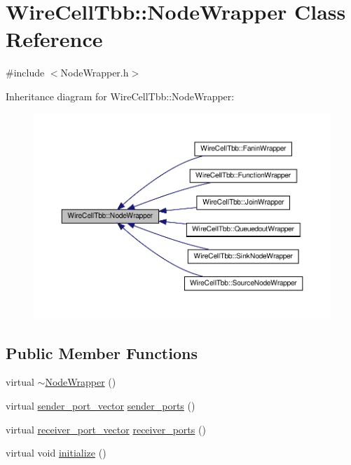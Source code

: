 \hypertarget{class_wire_cell_tbb_1_1_node_wrapper}{}\section{Wire\+Cell\+Tbb\+:\+:Node\+Wrapper Class Reference}
\label{class_wire_cell_tbb_1_1_node_wrapper}


{\ttfamily \#include $<$Node\+Wrapper.\+h$>$}



Inheritance diagram for Wire\+Cell\+Tbb\+:\+:Node\+Wrapper\+:
\nopagebreak
\begin{figure}[H]
\begin{center}
\leavevmode
\includegraphics[width=350pt]{class_wire_cell_tbb_1_1_node_wrapper__inherit__graph}
\end{center}
\end{figure}
\subsection*{Public Member Functions}
\begin{DoxyCompactItemize}
\item 
virtual \hyperlink{class_wire_cell_tbb_1_1_node_wrapper_a251ffca4138c2d0a1266fe1f91bbfd3b}{$\sim$\+Node\+Wrapper} ()
\item 
virtual \hyperlink{namespace_wire_cell_tbb_a99272fef0f0c33dc9d4e6e8f777b2e6e}{sender\+\_\+port\+\_\+vector} \hyperlink{class_wire_cell_tbb_1_1_node_wrapper_a4ed2daeddbb2f75934759ac8f9a3ce8b}{sender\+\_\+ports} ()
\item 
virtual \hyperlink{namespace_wire_cell_tbb_a87f42fe8a3ccc3bf9d315cb2d252c7af}{receiver\+\_\+port\+\_\+vector} \hyperlink{class_wire_cell_tbb_1_1_node_wrapper_ac3c636904e4d3d1df0939906dd8853c7}{receiver\+\_\+ports} ()
\item 
virtual void \hyperlink{class_wire_cell_tbb_1_1_node_wrapper_a28e71be3d95b85701c947def9d11af64}{initialize} ()
\end{DoxyCompactItemize}


